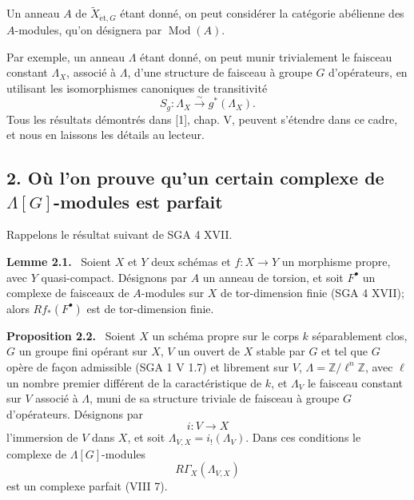 \documentclass[11pt]{article}
\newenvironment{statement}[1]{\par\medskip\noindent\textbf{#1.}\ }{\par\medskip}
\providecommand{\et}{\mathrm{\acute{e}t}}
\providecommand{\Mod}{\operatorname{Mod}}
\begin{document}
Un anneau $A$ de $\widetilde X_{\et,G}$ étant donné, on peut considérer la catégorie abélienne des $A$-modules, qu'on désignera par $\Mod(A)$.

Par exemple, un anneau $\Lambda$ étant donné, on peut munir trivialement le faisceau constant $\Lambda_X$, associé à $\Lambda$, d'une structure de faisceau à groupe $G$ d'opérateurs, en utilisant les isomorphismes canoniques de transitivité
\[
S_g:\Lambda_X\xrightarrow{\sim}g^*(\Lambda_X).
\]
Tous les résultats démontrés dans [1], chap. V, peuvent s'étendre dans ce cadre, et nous en laissons les détails au lecteur.

\subsection*{2. Où l'on prouve qu'un certain complexe de $\Lambda[G]$-modules est parfait}

Rappelons le résultat suivant de SGA 4 XVII.

\begin{statement}{Lemme 2.1}
Soient $X$ et $Y$ deux schémas et $f:X\to Y$ un morphisme propre, avec $Y$ quasi-compact. Désignons par $A$ un anneau de torsion, et soit $F^\bullet$ un complexe de faisceaux de $A$-modules sur $X$ de tor-dimension finie (SGA 4 XVII); alors $Rf_*(F^\bullet)$ est de tor-dimension finie.
\end{statement}

\begin{statement}{Proposition 2.2}
Soient $X$ un schéma propre sur le corps $k$ séparablement clos, $G$ un groupe fini opérant sur $X$, $V$ un ouvert de $X$ stable par $G$ et tel que $G$ opère de façon admissible (SGA 1 V 1.7) et librement sur $V$, $\Lambda=\mathbb Z/\ell^n\mathbb Z$, avec $\ell$ un nombre premier différent de la caractéristique de $k$, et $\Lambda_V$ le faisceau constant sur $V$ associé à $\Lambda$, muni de sa structure triviale de faisceau à groupe $G$ d'opérateurs. Désignons par
\[
i:V\longrightarrow X
\]
l'immersion de $V$ dans $X$, et soit $\Lambda_{V,X}=i_!(\Lambda_V)$. Dans ces conditions le complexe de $\Lambda[G]$-modules
\[
R\Gamma_X(\Lambda_{V,X})
\]
est un complexe parfait (VIII 7).
\end{statement}
\end{document}

